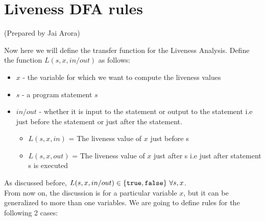 \setlength{\parindent}{0pt}

\clearpage
\section{Liveness DFA rules}
(Prepared by Jai Arora)
\vspace{0.3cm}

Now here we will define the transfer function for the Liveness Analysis. Define the function $L(s,x,in/out)$ as follows:

\begin{itemize}
    \item $x$ - the variable for which we want to compute the liveness values
    \item $s$ - a program statement $s$
    \item $in/out$ - whether it is input to the statement or output to the statement i.e just before the statement or just after the statement.
    \begin{itemize}
        \item $L(s, x, in)$ = The liveness value of $x$ just before s
        \item $L(s, x, out)$ = The liveness value of $x$ just after s i.e just after statement s is executed
    \end{itemize}
\end{itemize}

As discussed before, $L(s,x,in/out) \in \{{\tt true}, {\tt false}\}~\forall s,x$.\\

From now on, the discussion is for a particular variable $x$, but it can be generalized to more than one variables. We are going to define rules for the following 2 cases:

